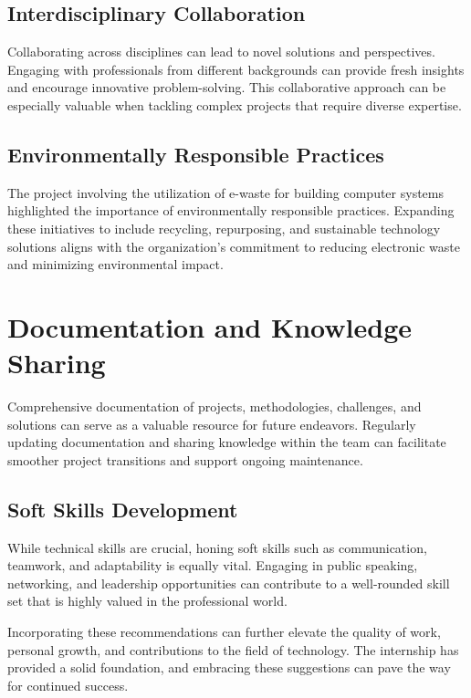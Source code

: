 \subsection{Interdisciplinary Collaboration}
Collaborating across disciplines can lead to novel solutions and perspectives. Engaging with professionals from different backgrounds can provide fresh insights and encourage innovative problem-solving. This collaborative approach can be especially valuable when tackling complex projects that require diverse expertise.

\subsection{Environmentally Responsible Practices}
The project involving the utilization of e-waste for building computer systems highlighted the importance of environmentally responsible practices. Expanding these initiatives to include recycling, repurposing, and sustainable technology solutions aligns with the organization's commitment to reducing electronic waste and minimizing environmental impact.

\section{Documentation and Knowledge Sharing}
Comprehensive documentation of projects, methodologies, challenges, and solutions can serve as a valuable resource for future endeavors. Regularly updating documentation and sharing knowledge within the team can facilitate smoother project transitions and support ongoing maintenance.

\subsection{Soft Skills Development}
While technical skills are crucial, honing soft skills such as communication, teamwork, and adaptability is equally vital. Engaging in public speaking, networking, and leadership opportunities can contribute to a well-rounded skill set that is highly valued in the professional world.

Incorporating these recommendations can further elevate the quality of work, personal growth, and contributions to the field of technology. The internship has provided a solid foundation, and embracing these suggestions can pave the way for continued success.



